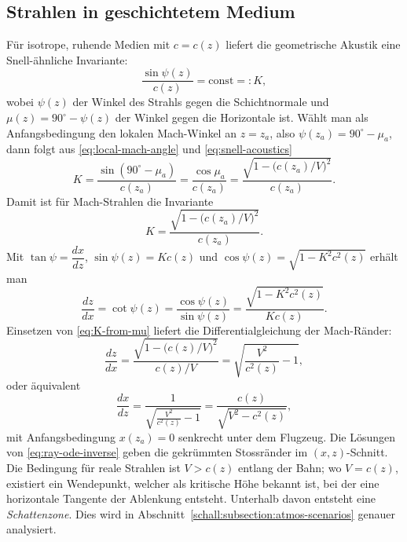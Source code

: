 \subsection{Strahlen in geschichtetem Medium}
Für isotrope, ruhende Medien mit $c=c(z)$ liefert die geometrische
Akustik eine Snell-ähnliche Invariante:
\begin{equation}
  \frac{\sin\psi(z)}{c(z)} = \text{const} =: K ,
  \label{eq:snell-acoustics}
\end{equation}
wobei $\psi(z)$ der Winkel des Strahls gegen die
Schichtnormale und $\mu(z)=90^\circ-\psi(z)$ der Winkel gegen
die Horizontale ist.
Wählt man als Anfangsbedingung den lokalen Mach-Winkel an $z=z_a$,
also $\psi(z_a)=90^\circ-\mu_a$, dann folgt aus
\eqref{eq:local-mach-angle} und \eqref{eq:snell-acoustics}
\[
  K = \frac{\sin(90^\circ-\mu_a)}{c(z_a)} =
  \frac{\cos\mu_a}{c(z_a)} =
  \frac{\sqrt{1-\bigl(c(z_a)/V\bigr)^2}}{c(z_a)}.
\]
Damit ist für Mach-Strahlen die Invariante
\begin{equation}
  K = \frac{\sqrt{1-\bigl(c(z_a)/V\bigr)^2}}{c(z_a)}.
  \label{eq:K-from-mu}
\end{equation}
Mit $\tan\psi = \dfrac{dx}{dz}$, $\sin\psi(z) = Kc(z)$ und
$\cos\psi(z) = \sqrt{1 - K^2 c^2(z)}$ erhält man
\begin{equation*}
  \frac{dz}{dx} = \cot\psi(z) =
  \frac{\cos\psi(z)}{\sin\psi(z)} =
  \frac{\sqrt{1 - K^2 c^2(z)}}{Kc(z)}.
\end{equation*}
Einsetzen von \eqref{eq:K-from-mu} liefert die
Differentialgleichung der Mach-Ränder:
\[
  \frac{dz}{dx} = \frac{\sqrt{1 - \bigl(c(z)/V\bigr)^2}}{c(z)/V}
  = \sqrt{\frac{V^2}{c^2(z)} - 1},
\]
oder äquivalent
\begin{equation}
  \frac{dx}{dz} = \frac{1}{\sqrt{\frac{V^2}{c^2(z)} - 1}} =
  \frac{c(z)}{\sqrt{V^2 - c^2(z)}},
  \label{eq:ray-ode-inverse}
\end{equation}
mit Anfangsbedingung $x(z_a)=0$ senkrecht unter dem Flugzeug.
Die Lösungen von \eqref{eq:ray-ode-inverse} geben die gekrümmten Stossränder
im $(x,z)$-Schnitt.
Die Bedingung für reale Strahlen ist $V>c(z)$
entlang der Bahn; wo $V=c(z)$, existiert ein Wendepunkt, welcher als
kritische Höhe bekannt ist, bei der eine horizontale Tangente der Ablenkung entsteht.
Unterhalb davon entsteht eine \emph{Schattenzone}.
%
Dies wird in Abschnitt~\ref{schall:subsection:atmos-scenarios} genauer analysiert.

